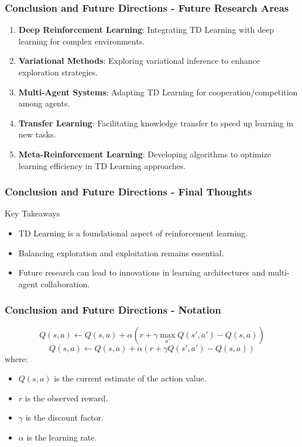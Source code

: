 \documentclass[aspectratio=169]{beamer}
\begin{document}
\begin{frame}[fragile]
    \frametitle{Conclusion and Future Directions - Future Research Areas}
    \begin{enumerate}
        \item \textbf{Deep Reinforcement Learning}: Integrating TD Learning with deep learning for complex environments.
        \item \textbf{Variational Methods}: Exploring variational inference to enhance exploration strategies.
        \item \textbf{Multi-Agent Systems}: Adapting TD Learning for cooperation/competition among agents.
        \item \textbf{Transfer Learning}: Facilitating knowledge transfer to speed up learning in new tasks.
        \item \textbf{Meta-Reinforcement Learning}: Developing algorithms to optimize learning efficiency in TD Learning approaches.
    \end{enumerate}
\end{frame}

\begin{frame}[fragile]
    \frametitle{Conclusion and Future Directions - Final Thoughts}
    \begin{block}{Key Takeaways}
        \begin{itemize}
            \item TD Learning is a foundational aspect of reinforcement learning.
            \item Balancing exploration and exploitation remains essential.
            \item Future research can lead to innovations in learning architectures and multi-agent collaboration.
        \end{itemize}
    \end{block}
\end{frame}

\begin{frame}[fragile]
    \frametitle{Conclusion and Future Directions - Notation}
    \begin{equation}
        Q(s, a) \leftarrow Q(s, a) + \alpha \left( r + \gamma \max_{a'} Q(s', a') - Q(s, a) \right)
    \end{equation}
    \begin{equation}
        Q(s, a) \leftarrow Q(s, a) + \alpha \left( r + \gamma Q(s', a') - Q(s, a) \right)
    \end{equation}
    where:
    \begin{itemize}
        \item \( Q(s, a) \) is the current estimate of the action value.
        \item \( r \) is the observed reward.
        \item \( \gamma \) is the discount factor.
        \item \( \alpha \) is the learning rate.
    \end{itemize}
\end{frame}
\end{document}
